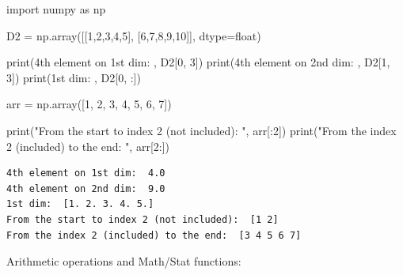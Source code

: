 \documentclass[
  letterpaper,
  DIV=11,
  numbers=noendperiod]{scrreprt}
\newenvironment{Shaded}{\begin{snugshade}}{\end{snugshade}}
\newcommand{\BuiltInTok}[1]{\textcolor[rgb]{0.00,0.23,0.31}{#1}}
\newcommand{\DecValTok}[1]{\textcolor[rgb]{0.68,0.00,0.00}{#1}}
\newcommand{\ImportTok}[1]{\textcolor[rgb]{0.00,0.46,0.62}{#1}}
\newcommand{\NormalTok}[1]{\textcolor[rgb]{0.00,0.23,0.31}{#1}}
\newcommand{\OperatorTok}[1]{\textcolor[rgb]{0.37,0.37,0.37}{#1}}
\newcommand{\StringTok}[1]{\textcolor[rgb]{0.13,0.47,0.30}{#1}}
\begin{document}
\begin{Shaded}
\begin{Highlighting}[]
\ImportTok{import}\NormalTok{ numpy }\ImportTok{as}\NormalTok{ np}

\NormalTok{D2 }\OperatorTok{=}\NormalTok{ np.array([[}\DecValTok{1}\NormalTok{,}\DecValTok{2}\NormalTok{,}\DecValTok{3}\NormalTok{,}\DecValTok{4}\NormalTok{,}\DecValTok{5}\NormalTok{], [}\DecValTok{6}\NormalTok{,}\DecValTok{7}\NormalTok{,}\DecValTok{8}\NormalTok{,}\DecValTok{9}\NormalTok{,}\DecValTok{10}\NormalTok{]], dtype}\OperatorTok{=}\BuiltInTok{float}\NormalTok{)}

\BuiltInTok{print}\NormalTok{(}\StringTok{\textquotesingle{}4th element on 1st dim: \textquotesingle{}}\NormalTok{, D2[}\DecValTok{0}\NormalTok{, }\DecValTok{3}\NormalTok{])}
\BuiltInTok{print}\NormalTok{(}\StringTok{\textquotesingle{}4th element on 2nd dim: \textquotesingle{}}\NormalTok{, D2[}\DecValTok{1}\NormalTok{, }\DecValTok{3}\NormalTok{])}
\BuiltInTok{print}\NormalTok{(}\StringTok{\textquotesingle{}1st dim: \textquotesingle{}}\NormalTok{, D2[}\DecValTok{0}\NormalTok{, :])}

\NormalTok{arr }\OperatorTok{=}\NormalTok{ np.array([}\DecValTok{1}\NormalTok{, }\DecValTok{2}\NormalTok{, }\DecValTok{3}\NormalTok{, }\DecValTok{4}\NormalTok{, }\DecValTok{5}\NormalTok{, }\DecValTok{6}\NormalTok{, }\DecValTok{7}\NormalTok{])}

\BuiltInTok{print}\NormalTok{(}\StringTok{"From the start to index 2 (not included): "}\NormalTok{, arr[:}\DecValTok{2}\NormalTok{])}
\BuiltInTok{print}\NormalTok{(}\StringTok{"From the index 2 (included) to the end: "}\NormalTok{, arr[}\DecValTok{2}\NormalTok{:])}
\end{Highlighting}
\end{Shaded}

\begin{verbatim}
4th element on 1st dim:  4.0
4th element on 2nd dim:  9.0
1st dim:  [1. 2. 3. 4. 5.]
From the start to index 2 (not included):  [1 2]
From the index 2 (included) to the end:  [3 4 5 6 7]
\end{verbatim}

Arithmetic operations and Math/Stat functions:
\end{document}
